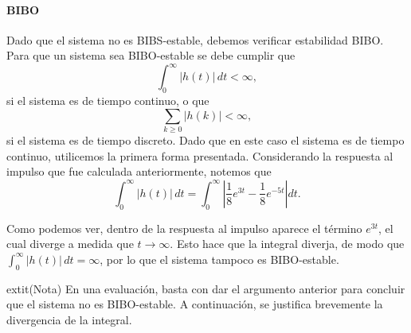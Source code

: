 \documentclass[
  11pt,
  letterpaper,
   addpoints,
   answers
  ]{exam}
\begin{document}
\begin{questions}
\begin{solution}
\paragraph*{BIBO}
Dado que el sistema no es BIBS-estable, debemos verificar estabilidad BIBO. Para que un sistema sea BIBO-estable se debe cumplir que
\setcounter{equation}{62}
\begin{equation}
\int_{0}^{\infty} |h(t)|\,dt < \infty,
\end{equation}
si el sistema es de tiempo continuo, o que
\begin{equation}
\sum_{k\ge 0} |h(k)| < \infty,
\end{equation}
si el sistema es de tiempo discreto. Dado que en este caso el sistema es de tiempo continuo, utilicemos la primera forma presentada. Considerando la respuesta al impulso que fue calculada anteriormente, notemos que
\begin{equation}
\int_{0}^{\infty} |h(t)|\,dt
=\int_{0}^{\infty} \left| \frac{1}{8}e^{3t}-\frac{1}{8}e^{-5t} \right| dt.
\end{equation}

Como podemos ver, dentro de la respuesta al impulso aparece el término $e^{3t}$, el cual diverge a medida que $t\to\infty$. Esto hace que la integral diverja, de modo que $\int_{0}^{\infty} |h(t)|\,dt=\infty$, por lo que el sistema tampoco es BIBO-estable.

	extit{(Nota)} En una evaluación, basta con dar el argumento anterior para concluir que el sistema no es BIBO-estable. A continuación, se justifica brevemente la divergencia de la integral.


\end{solution}
\end{questions}
\end{document}
